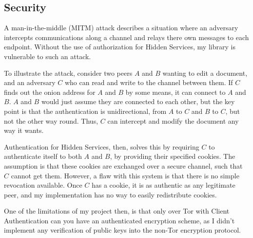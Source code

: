 \documentclass[diss.tex]{subfiles}
\begin{document}
\subsection{Security}
A man-in-the-middle (MITM) attack describes a situation where an adversary intercepts communications along a channel and relays there own messages to each endpoint. Without the use of authorization for Hidden Services, my library is vulnerable to such an attack. 

To illustrate the attack, consider two peers $A$ and $B$ wanting to edit a document, and an adversary $C$ who can read and write to the channel between them. If $C$ finds out the onion address for $A$ and $B$ by some means, it can connect to $A$ and $B$. $A$ and $B$ would just assume they are connected to each other, but the key point is that the authentication is unidirectional, from $A$ to $C$ and $B$ to $C$, but not the other way round. Thus, $C$ can intercept and modify the document any way it wants. 

Authentication for Hidden Services, then, solves this by requiring $C$ to authenticate itself to both $A$ and $B$, by providing their specified cookies. The assumption is that these cookies are exchanged over a secure channel, such that $C$ cannot get them. However, a flaw with this system is that there is no simple revocation available. Once $C$ has a cookie, it is as authentic as any legitimate peer, and my implementation has no way to easily redistribute cookies.

One of the limitations of my project then, is that only over Tor with Client Authentication can you have an authenticated encryption scheme, as I didn't implement any verification of public keys into the non-Tor encryption protocol.
\end{document}
